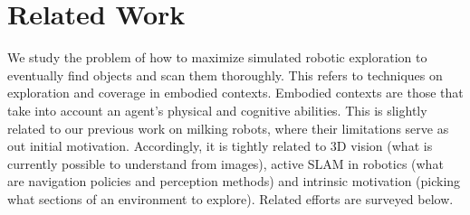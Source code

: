 \section{Related Work}\label{chap2:related-work}
We study the problem of how to maximize simulated robotic exploration to eventually find objects and scan them thoroughly. This refers to techniques on exploration and coverage in embodied contexts. Embodied contexts are those that take into account an agent’s physical and cognitive abilities. This is slightly related to our previous work on milking robots, where their limitations serve as out initial motivation. Accordingly, it is tightly related to 3D vision (what is currently possible to understand from images), active SLAM in robotics (what are navigation policies and perception methods) and intrinsic motivation (picking what sections of an environment to explore). Related efforts are surveyed below.

